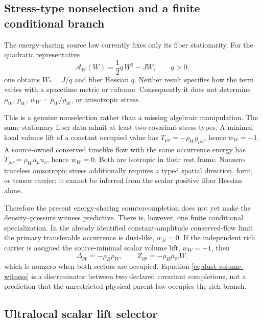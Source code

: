 \documentclass[11pt]{article}
\begin{document}
\subsection{Stress-type nonselection and a finite conditional branch}

The energy-sharing source law currently fixes only its fiber stationarity.
For the quadratic representative
\begin{equation}
 \mathcal A_W(W)=\frac12 q\,W^2-JW,\qquad q>0,
 \label{eq:work-fiber-action}
\end{equation}
one obtains \(W_*=J/q\) and fiber Hessian \(q\).  Neither result specifies
how the term varies with a spacetime metric or coframe.  Consequently it does
not determine \(\rho_W\), \(p_W\), \(w_W=p_W/\rho_W\), or anisotropic stress.

This is a genuine nonselection rather than a missing algebraic manipulation.
The same stationary fiber data admit at least two covariant stress types.  A
minimal local volume lift of a constant occupied value has
\(T_{\mu\nu}=-\rho_W g_{\mu\nu}\), hence \(w_W=-1\).  A source-owned conserved
timelike flow with the same occurrence energy has
\(T_{\mu\nu}=\rho_W u_\mu u_\nu\), hence \(w_W=0\).  Both are isotropic in their
rest frame.  Nonzero traceless anisotropic stress additionally requires a
typed spatial direction, form, or tensor carrier; it cannot be inferred from
the scalar positive fiber Hessian alone.

Therefore the present energy-sharing countercompletion does not yet make the
density--pressure witness predictive.  There is, however, one finite
conditional specialization.  In the already identified constant-amplitude
conserved-flow limit the primary transferable occurrence is dust-like,
\(w_B=0\).  If the independent rich carrier is assigned the source-minimal
scalar volume lift, \(w_W=-1\), then
\begin{equation}
 \Delta_{\rho p}=-\rho_B\rho_W,
 \qquad
 Z_{\rho p}=-\rho_B\rho_W W,
 \label{eq:dust-volume-witness}
\end{equation}
which is nonzero when both sectors are occupied.  Equation
\eqref{eq:dust-volume-witness} is a discriminator between two declared
covariant completions, not a prediction that the unrestricted physical parent
law occupies the rich branch.

\subsection{Ultralocal scalar lift selector}
\end{document}
